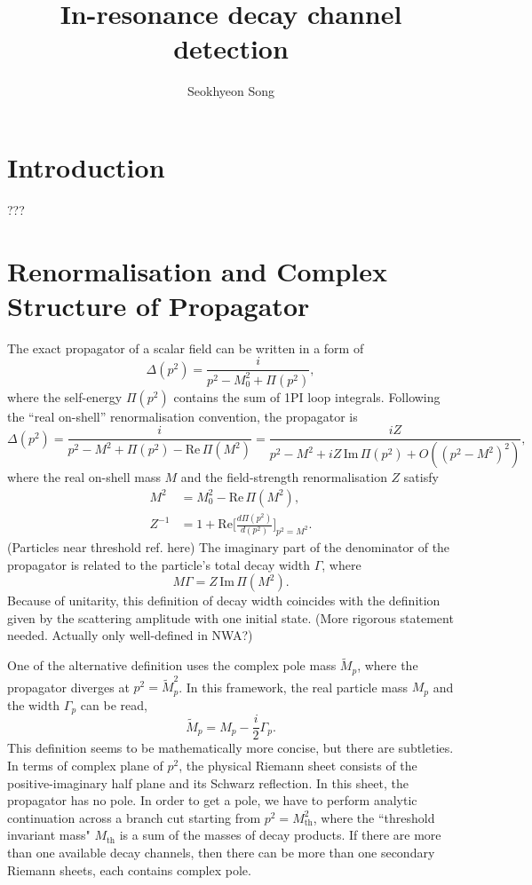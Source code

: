 \documentclass[11pt]{article}
\theoremstyle{definition}
\theoremstyle{remark}
\begin{document}
	\title{In-resonance decay channel detection}
	\author{Seokhyeon Song}
	\maketitle
	
	\section{Introduction}
	???
	
	\section{Renormalisation and Complex Structure of Propagator}
	The exact propagator of a scalar field can be written in a form of
	\[\Delta(p^{2})=\frac{i}{p^{2}-M_{0}^{2}+\Pi(p^{2})},\]
	where the self-energy $\Pi(p^{2})$ contains the sum of 1PI loop integrals.
	Following the ``real on-shell'' renormalisation convention, the propagator is
	\[\Delta(p^{2})=\frac{i}{p^{2}-M^{2}+\Pi(p^{2})-\mathrm{Re}\,\Pi(M^{2})}=\frac{iZ}{p^{2}-M^{2}+iZ\,\mathrm{Im}\,\Pi(p^{2})+O((p^{2}-M^{2})^{2})},\]
	where the real on-shell mass $M$ and the field-strength renormalisation $Z$ satisfy
	\begin{align*}
		M^{2}&=M_{0}^{2}-\mathrm{Re}\,\Pi(M^{2}),\\
		Z^{-1}&=1+\mathrm{Re}\bigg[\frac{d\Pi(p^{2})}{d(p^{2})}\bigg]_{p^{2}=M^{2}}.
	\end{align*}
	(Particles near threshold ref. here)
	The imaginary part of the denominator of the propagator is related to the particle's total decay width $\Gamma$, where
	\[M\Gamma=Z\,\mathrm{Im}\,\Pi(M^{2}).\]
	Because of unitarity, this definition of decay width coincides with the definition given by the scattering amplitude with one initial state. (More rigorous statement needed. Actually only well-defined in NWA?)
	
	One of the alternative definition uses the complex pole mass $\tilde{M}_{p}$, where the propagator diverges at $p^{2}=\tilde{M}_{p}^{2}$.
	In this framework, the real particle mass $M_{p}$ and the width $\Gamma_{p}$ can be read,
	\[\tilde{M}_{p}=M_{p}-\frac{i}{2}\Gamma_{p}.\]
	This definition seems to be mathematically more concise, but there are subtleties.
	In terms of complex plane of $p^{2}$, the physical Riemann sheet consists of the positive-imaginary half plane and its Schwarz reflection.
	In this sheet, the propagator has no pole.
	In order to get a pole, we have to perform analytic continuation across a branch cut starting from $p^{2}=M_{\mathrm{th}}^{2}$, where the ``threshold invariant mass" $M_{\mathrm{th}}$ is a sum of the masses of decay products.
	If there are more than one available decay channels, then there can be more than one secondary Riemann sheets, each contains complex pole.
	
\end{document}
